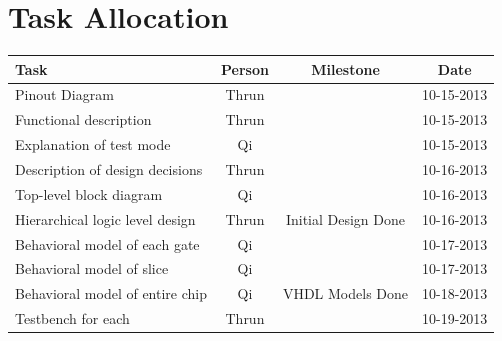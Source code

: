 \documentclass{article}
\begin{document}

\newpage

\section*{Task Allocation}

\begin{table}[H]
    \centering
    \begin{tabular}{p{}ccc}
        \toprule
        \textbf{Task} & \textbf{Person} & \textbf{Milestone} & \textbf{Date}\\
        \midrule
        Pinout Diagram                                                                                        & Thrun &                               & 10-15-2013 \\
        Functional description                                                                                & Thrun &                               & 10-15-2013 \\
        Explanation of test mode                                                                              & Qi    &                               & 10-15-2013 \\
        Description of design decisions                                                                       & Thrun &                               & 10-16-2013 \\
        Top-level block diagram                                                                               & Qi    &                               & 10-16-2013 \\
        Hierarchical logic level design                                                                       & Thrun & Initial Design Done           & 10-16-2013 \\
        Behavioral model of each gate                                                                         & Qi    &                               & 10-17-2013 \\
        Behavioral model of slice                                                                             & Qi    &                               & 10-17-2013 \\
        Behavioral model of entire chip                                                                       & Qi    & VHDL Models Done              & 10-18-2013 \\
        Testbench for each                                                                                    & Thrun &                               & 10-19-2013 \\

\end{tabular}
\end{table}
\end{document}

